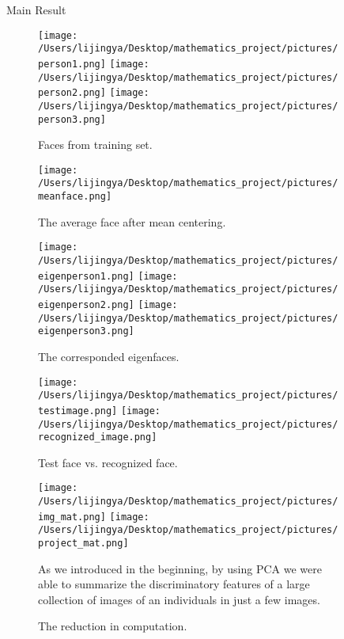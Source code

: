 \documentclass[final]{beamer}
\newlength{\sepwid}
\newlength{\onecolwid}
\newlength{\middlecolwid}
\begin{document}
\begin{frame}[t]
\begin{columns}[t]
\begin{column}{\onecolwid}
\end{column} %


\begin{column}{\sepwid}\end{column} %

\begin{column}{\middlecolwid} %

\begin{alertblock}{Main Result} 
\begin{figure}[h]
\centering
\texttt{[image: /Users/lijingya/Desktop/mathematics\_project/pictures/person1.png]}
\texttt{[image: /Users/lijingya/Desktop/mathematics\_project/pictures/person2.png]}
\texttt{[image: /Users/lijingya/Desktop/mathematics\_project/pictures/person3.png]}
\caption{ Faces from training set.}
\end{figure}
\begin{figure}[h]
\centering
\texttt{[image: /Users/lijingya/Desktop/mathematics\_project/pictures/meanface.png]}
\caption{ The average face after mean centering.}
\end{figure}
\begin{figure}[h]
\centering
\texttt{[image: /Users/lijingya/Desktop/mathematics\_project/pictures/eigenperson1.png]}
\texttt{[image: /Users/lijingya/Desktop/mathematics\_project/pictures/eigenperson2.png]}
\texttt{[image: /Users/lijingya/Desktop/mathematics\_project/pictures/eigenperson3.png]}
\caption{ The corresponded eigenfaces.}
\end{figure}
\begin{figure}[h]
\centering
\texttt{[image: /Users/lijingya/Desktop/mathematics\_project/pictures/testimage.png]}
\texttt{[image: /Users/lijingya/Desktop/mathematics\_project/pictures/recognized\_image.png]}
\caption{ Test face vs. recognized face.}
\end{figure}
\begin{figure}[h]
\centering
\texttt{[image: /Users/lijingya/Desktop/mathematics\_project/pictures/img\_mat.png]}
\texttt{[image: /Users/lijingya/Desktop/mathematics\_project/pictures/project\_mat.png]}
\caption{ The reduction in computation.}
As we introduced in the beginning, by using PCA we were able to summarize the discriminatory features of a large collection of images of an individuals in just a few images.
\end{figure}
\vspace{2mm}


\end{alertblock}
\end{column}
\end{columns}
\end{frame}
\end{document}
